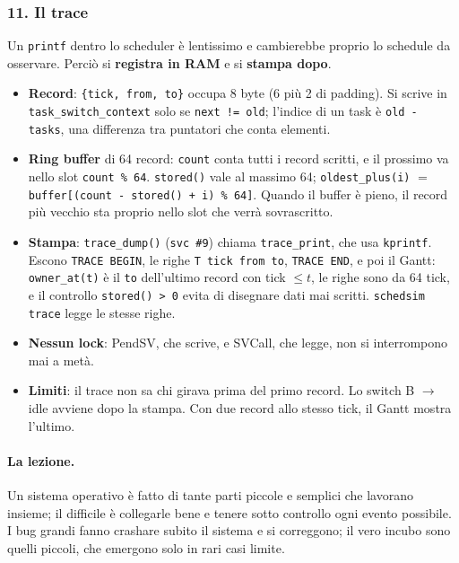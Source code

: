 \subsubsection*{11. Il trace}
Un \texttt{printf} dentro lo scheduler è lentissimo e cambierebbe proprio lo schedule da osservare. Perciò si \textbf{registra in RAM} e si \textbf{stampa dopo}.
\begin{itemize}
    \item \textbf{Record}: \texttt{\{tick, from, to\}} occupa 8 byte (6 più 2 di padding). Si scrive in \texttt{task\_switch\_context} solo se \texttt{next != old}; l'indice di un task è \texttt{old - tasks}, una differenza tra puntatori che conta elementi.
    \item \textbf{Ring buffer} di 64 record: \texttt{count} conta tutti i record scritti, e il prossimo va nello slot \texttt{count \% 64}. \texttt{stored()} vale al massimo 64; \texttt{oldest\_plus(i)} $=$ \texttt{buffer[(count - stored() + i) \% 64]}. Quando il buffer è pieno, il record più vecchio sta proprio nello slot che verrà sovrascritto.
    \item \textbf{Stampa}: \texttt{trace\_dump()} (\texttt{svc \#9}) chiama \texttt{trace\_print}, che usa \texttt{kprintf}. Escono \texttt{TRACE BEGIN}, le righe \texttt{T tick from to}, \texttt{TRACE END}, e poi il Gantt: \texttt{owner\_at(t)} è il \texttt{to} dell'ultimo record con tick $\le t$, le righe sono da 64 tick, e il controllo \texttt{stored() > 0} evita di disegnare dati mai scritti. \texttt{schedsim trace} legge le stesse righe.
    \item \textbf{Nessun lock}: PendSV, che scrive, e SVCall, che legge, non si interrompono mai a metà.
    \item \textbf{Limiti}: il trace non sa chi girava prima del primo record. Lo switch B $\to$ idle avviene dopo la stampa. Con due record allo stesso tick, il Gantt mostra l'ultimo.
\end{itemize}

\paragraph*{La lezione.} Un sistema operativo è fatto di tante parti piccole e semplici che lavorano insieme; il difficile è collegarle bene e tenere sotto controllo ogni evento possibile. I bug grandi fanno crashare subito il sistema e si correggono; il vero incubo sono quelli piccoli, che emergono solo in rari casi limite.



